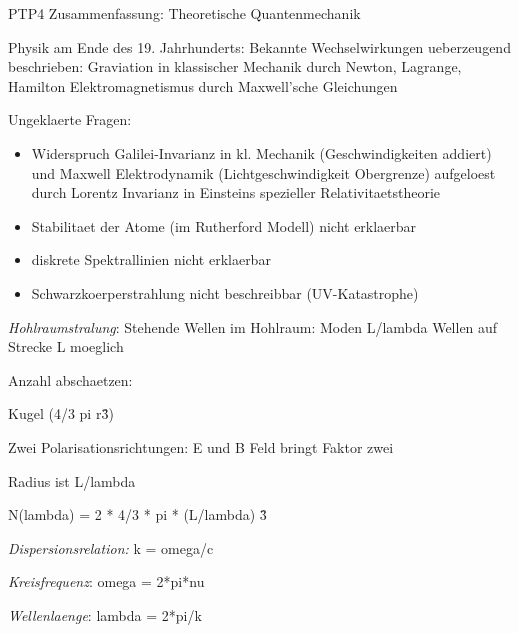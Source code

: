 \documentclass{article}
\begin{document}
\begin{center}
\large
PTP4 Zusammenfassung: Theoretische Quantenmechanik
\end{center}


Physik am Ende des 19. Jahrhunderts: 
Bekannte Wechselwirkungen ueberzeugend beschrieben: 
Graviation in klassischer Mechanik durch Newton, Lagrange, Hamilton
Elektromagnetismus durch Maxwell'sche Gleichungen

Ungeklaerte Fragen: 
\begin{itemize}
\item Widerspruch Galilei-Invarianz in kl. Mechanik (Geschwindigkeiten addiert) und Maxwell Elektrodynamik (Lichtgeschwindigkeit Obergrenze) aufgeloest durch Lorentz Invarianz in Einsteins spezieller Relativitaetstheorie
\item Stabilitaet der Atome (im Rutherford Modell) nicht erklaerbar
\item diskrete Spektrallinien nicht erklaerbar
\item Schwarzkoerperstrahlung nicht beschreibbar (UV-Katastrophe)
\end{itemize}

\emph{Hohlraumstralung}: 
Stehende Wellen im Hohlraum: Moden
L/lambda Wellen auf Strecke L moeglich


Anzahl abschaetzen:


Kugel (4/3 pi r\^3)


Zwei Polarisationsrichtungen: E und B Feld bringt Faktor zwei


Radius ist L/lambda 


N(lambda)  = 2 * 4/3 * pi * (L/lambda) \^3


\emph{Dispersionsrelation:} k = omega/c


\emph{Kreisfrequenz}: omega = 2*pi*nu


\emph{Wellenlaenge}: lambda = 2*pi/k
\end{document}
